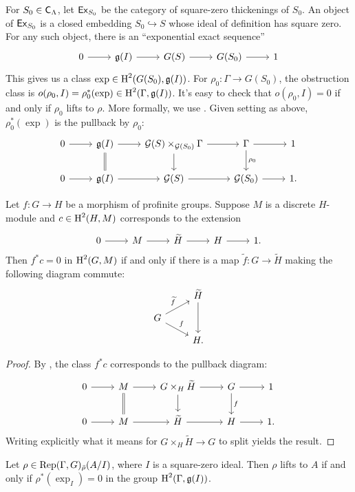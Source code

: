 For $S_0\in \mathsf{C}_\Lambda$, let $\mathsf{Ex}_{S_0}$ be the category of square-zero 
thickenings of $S_0$. An object of $\mathsf{Ex}_{S_0}$ is a closed embedding 
$S_0\hookrightarrow S$ whose ideal of definition has square zero. For any 
such object, there is an ``exponential exact sequence''
\[
\begin{tikzcd}
	0 \ar[r]
		& \fg(I) \ar[r]
		& G(S) \ar[r]
		& G(S_0) \ar[r]
		& 1
\end{tikzcd}
\]
This gives us a class $\exp\in \operatorname{H}^2(G(S_0),\mathfrak{g}(I))$. For 
$\rho_0\colon \Gamma\to G(S_0)$, the obstruction class is 
$o(\rho_0,I) = \rho_0^\ast(\exp)\in \operatorname{H}^2(\Gamma,\mathfrak{g}(I))$. It's easy to check 
that $o(\rho_0,I)=0$ if and only if $\rho_0$ lifts to $\rho$. More formally, 
we use \cite[6.6.4]{weibel-1994}. Given setting as above, $\rho_0^\ast(\exp)$ 
is the pullback by $\rho_0$:
\[
\begin{tikzcd}
	0 \ar[r] 
		& \fg(I) \ar[r] \ar[d, equals]
		& \cG(S)\times_{\cG(S_0)} \Gamma \ar[r] \ar[d] 
		& \Gamma \ar[d, "\rho_0"] \ar[r]
		& 1 \\
	0 \ar[r] 
		& \fg(I) \ar[r]
		& \cG(S) \ar[r] 
		& \cG(S_0) \ar[r] 
		& 1 .
\end{tikzcd}
\]

\begin{proposition}
Let $f\colon G\to H$ be a morphism of profinite groups. Suppose $M$ is a 
discrete $H$-module and $c\in \operatorname{H}^2(H,M)$ corresponds to the extension 
\[
\begin{tikzcd}
	0 \ar[r]
		& M \ar[r]
		& \widetilde H \ar[r]
		& H \ar[r] 
		& 1 .
\end{tikzcd}
\]
Then $f^\ast c=0$ in $\operatorname{H}^2(G,M)$ if and only if there is a map 
$\widetilde f\colon G\to \widetilde H$ making the following diagram commute: 
\[
\begin{tikzcd}[row sep=small]
	& \widetilde H \ar[dd] \\
	G \ar[ur, "\widetilde f"] \ar[dr, "f"] \\
	& H .
\end{tikzcd}
\]
\end{proposition}
\begin{proof}
By \cite[6.6.4]{weibel-1994}, the class $f^\ast c$ corresponds to the pullback 
diagram: 
\[
\begin{tikzcd}
	0 \ar[r]
		& M \ar[r] \ar[d, equals]
		& G\times_H \widetilde{H} \ar[r] \ar[d] 
		& G \ar[r] \ar[d, "f"]
		& 1 \\
	0 \ar[r]
		& M \ar[r]
		& \widetilde H \ar[r]
		& H \ar[r] 
		& 1 .
\end{tikzcd}
\]
Writing explicitly what it means for $G\times_H \widetilde H \to G$ to split 
yields the result. 
\end{proof}

\begin{corollary}
Let $\rho\in \operatorname{Rep}(\Gamma,G)_{\bar\rho}(A/I)$, where $I$ is a square-zero ideal. 
Then $\rho$ lifts to $A$ if and only if $\rho^\ast(\exp_I) = 0$ in the group 
$\operatorname{H}^2(\Gamma,\mathfrak{g}(I))$. 
\end{corollary}
